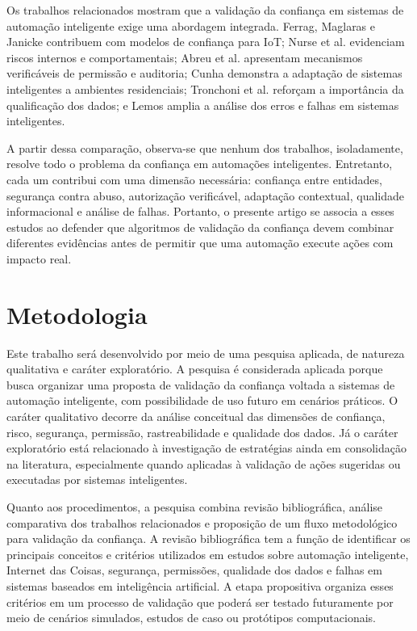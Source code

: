 \documentclass[12pt]{article}
\begin{document}
Os trabalhos relacionados mostram que a validação da confiança em sistemas de automação inteligente exige uma abordagem integrada. Ferrag, Maglaras e Janicke \cite{ferrag2019} contribuem com modelos de confiança para IoT; Nurse et al. \cite{nurse2015} evidenciam riscos internos e comportamentais; Abreu et al. \cite{abreu2025} apresentam mecanismos verificáveis de permissão e auditoria; Cunha \cite{cunha2018} demonstra a adaptação de sistemas inteligentes a ambientes residenciais; Tronchoni et al. \cite{tronchoni2010} reforçam a importância da qualificação dos dados; e Lemos \cite{lemos2024} amplia a análise dos erros e falhas em sistemas inteligentes.

A partir dessa comparação, observa-se que nenhum dos trabalhos, isoladamente, resolve todo o problema da confiança em automações inteligentes. Entretanto, cada um contribui com uma dimensão necessária: confiança entre entidades, segurança contra abuso, autorização verificável, adaptação contextual, qualidade informacional e análise de falhas. Portanto, o presente artigo se associa a esses estudos ao defender que algoritmos de validação da confiança devem combinar diferentes evidências antes de permitir que uma automação execute ações com impacto real.


\section{Metodologia}

Este trabalho será desenvolvido por meio de uma pesquisa aplicada, de natureza qualitativa e caráter exploratório. A pesquisa é considerada aplicada porque busca organizar uma proposta de validação da confiança voltada a sistemas de automação inteligente, com possibilidade de uso futuro em cenários práticos. O caráter qualitativo decorre da análise conceitual das dimensões de confiança, risco, segurança, permissão, rastreabilidade e qualidade dos dados. Já o caráter exploratório está relacionado à investigação de estratégias ainda em consolidação na literatura, especialmente quando aplicadas à validação de ações sugeridas ou executadas por sistemas inteligentes.

Quanto aos procedimentos, a pesquisa combina revisão bibliográfica, análise comparativa dos trabalhos relacionados e proposição de um fluxo metodológico para validação da confiança. A revisão bibliográfica tem a função de identificar os principais conceitos e critérios utilizados em estudos sobre automação inteligente, Internet das Coisas, segurança, permissões, qualidade dos dados e falhas em sistemas baseados em inteligência artificial. A etapa propositiva organiza esses critérios em um processo de validação que poderá ser testado futuramente por meio de cenários simulados, estudos de caso ou protótipos computacionais.
\end{document}
